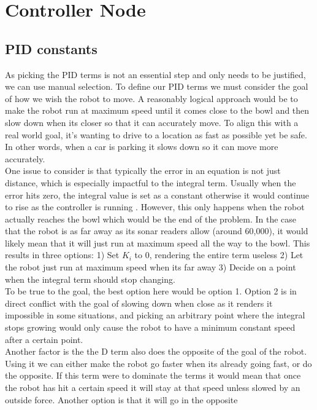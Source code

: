 \documentclass{article}
\newcommand\tab[1][1cm]{\hspace*{#1}}
\begin{document}
\section{Controller Node}\label{controllerSection}
\subsection{PID constants}
As picking the PID terms is not an essential step and only needs to be
justified, we can use manual selection. To define our PID terms we must consider
the goal of how we wish the robot to move. A reasonably logical approach would
be to make the robot run at maximum speed until it comes close to the bowl and
then slow down when its closer so that it can accurately move. To align this
with a real world goal, it's wanting to drive to a location as fast as possible
yet be safe. In other words, when a car is parking it slows down so it can move
more accurately.
\\
\tab One issue to consider is that typically the error in an equation is not just
distance, which is especially impactful to the integral term. Usually when the
error hits zero, the integral value is set as a constant otherwise it would
continue to rise as the controller is running \cite{kalman}. However, this only
happens when the robot actually reaches the bowl which would be the end of the
problem. In the case that the robot is as far away as its sonar readers allow
(around 60,000), it would likely mean that it will just run at maximum speed all
the way to the bowl. This results in three options: 1) Set $K_i$ to 0, rendering
the entire term useless 2) Let the robot just run at maximum speed when its far
away 3) Decide on a point when the integral term should stop changing. \\
\tab To be true to the goal, the best option here would be option 1. Option 2 is
in direct conflict with the goal of slowing down when close as it renders it
impossible in some situations, and picking an arbitrary point where the integral
stops growing would only cause the robot to have a minimum constant speed after
a certain point.
\\
\tab Another factor is the the D term also does the opposite of the goal of the
robot. Using it we can either make the robot go faster when its already going
fast, or do the opposite. If this term were to dominate the terms it would mean
that once the robot has hit a certain speed it will stay at that speed unless
slowed by an outside force. Another option is that it will go in the opposite
\end{document}

